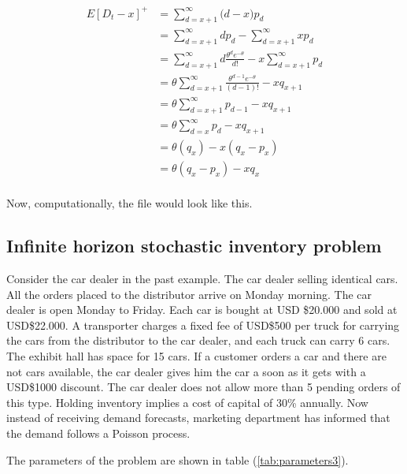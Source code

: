 \documentclass[11pt]{article}
\newcommand{\lstinclude}[1]{
	
}
\begin{document}
\begin{enumerate}
\begin{align*}
      E[D_t-x]^+ &= \sum_{d=x+1}^\infty \big(d-x\big)p_d \\
      &= \sum_{d=x+1}^\infty dp_d -\sum_{d=x+1}^\infty xp_d \\
      &= \sum_{d=x+1}^\infty d\frac{\theta^d e^{-\theta}}{d!} -x\sum_{d=x+1}^\infty p_d \\
      &= \theta\sum_{d=x+1}^\infty \frac{\theta^{d-1} e^{-\theta}}{(d-1)!} -xq_{x+1} \\
      &= \theta\sum_{d=x+1}^\infty {p_{d-1}} -xq_{x+1} \\
      &= \theta\sum_{d=x}^\infty {p_{d}} -xq_{x+1} \\
      &= \theta (q_{x}) -x(q_{x}-p_x) \\
      &= \theta (q_{x}-p_{x}) -xq_{x} \\
    \end{align*}
\end{enumerate}

Now, computationally, the file would look like this.


\lstinclude{StochasticDemand.java}

\subsection{Infinite horizon stochastic inventory problem}

Consider the car dealer in the past example. The car dealer selling identical cars. All the orders placed to the distributor arrive on Monday morning. The car dealer is open Monday to Friday. Each car is bought at USD \$20.000 and sold at USD\$22.000. A transporter charges a fixed fee of USD\$500 per truck for carrying the cars from the distributor to the car dealer, and each truck can carry 6 cars. The exhibit hall has space for 15 cars. If a customer orders a car and there are not cars available, the car dealer gives him the car a soon as it gets with a USD\$1000 discount. The car dealer does not allow more than 5 pending orders of this type. Holding inventory implies a cost of capital of 30\% annually. Now instead of receiving demand forecasts, marketing department has informed that the demand follows a Poisson process.

The parameters of the problem are shown in table (\ref{tab:parameters3}).
\end{document}
